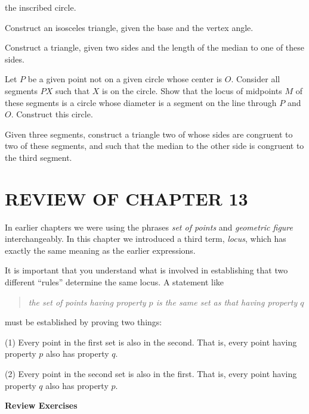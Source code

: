 \documentclass[11pt]{book}
\theoremstyle{bkplain}
\theoremstyle{XIplainnote}
\theoremstyle{bkplain}
\theoremstyle{bkplain}
\begin{document}
\begin{exercisecols}
\begin{exlist}
      the inscribed circle.
\item[17.] Construct an isosceles triangle, given the base and the vertex angle.
\item[18.] Construct a triangle, given two sides and the length of the median to
      one of these sides.
\item[\stex 19.] Let $P$ be a given point not on a given circle whose center is
      $O$. Consider all segments $PX$ such that $X$ is on the circle. Show that
      the locus of midpoints $M$ of these segments is a circle whose diameter is
      a segment on the line through $P$ and $O$. Construct this circle.
\item[\stex 20.] Given three segments, construct a triangle two of whose sides
      are congruent to two of these segments, and such that the median to the
      other side is congruent to the third segment.
\end{exlist}
\end{exercisecols}

\section*{REVIEW OF CHAPTER 13}

In earlier chapters we were using the phrases \emph{set of points} and
\emph{geometric figure} interchangeably. In this chapter we introduced a third
term, \emph{locus}, which has exactly the same meaning as the earlier
expressions.

It is important that you understand what is involved in establishing that two
different ``rules'' determine the same locus. A statement like

\begin{quote}
\emph{the set of points having property $p$ is the same set as that having
property $q$}
\end{quote}

\noindent must be established by proving two things:

(1) Every point in the first set is also in the second. That is, every point
having property $p$ also has property $q$.

(2) Every point in the second set is also in the first. That is, every point
having property $q$ also has property $p$.

\par\medskip\begin{center}\bfseries Review Exercises\end{center}\par\nopagebreak
\end{document}
